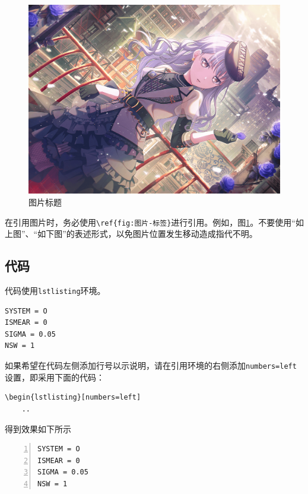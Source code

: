 \begin{figure}
    \centering
    \includegraphics[width=1\linewidth]{fig.png}
    \caption{图片标题}
    \label{fig:图片-标签}
\end{figure}

\begin{attention}
    在引用图片时，务必使用\verb|\ref{fig:图片-标签}|进行引用。例如，图\ref{fig:图片-标签}。不要使用“如上图”、“如下图”的表述形式，以免图片位置发生移动造成指代不明。
\end{attention}

\subsection{代码}\label{subsec:关于如何使用LaTeX编写模板-代码}

代码使用\verb|lstlisting|环境。

\begin{lstlisting}
SYSTEM = O
ISMEAR = 0
SIGMA = 0.05
NSW = 1
\end{lstlisting}

如果希望在代码左侧添加行号以示说明，请在引用环境的右侧添加\verb|numbers=left|设置，即采用下面的代码：

\begin{lstlisting}[frame=line]
\begin{lstlisting}[numbers=left]
    ..
\end{lstlisting}

得到效果如下所示

\begin{lstlisting}[numbers=left]
SYSTEM = O
ISMEAR = 0
SIGMA = 0.05
NSW = 1
\end{lstlisting}

